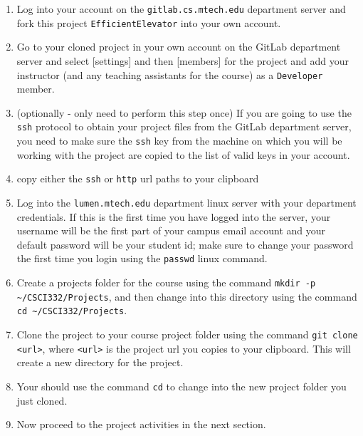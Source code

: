 \documentclass[10pt]{article}
\begin{document}
\begin{enumerate}
   \item Log into your account on the \verb|gitlab.cs.mtech.edu| department server and fork this project \verb|EfficientElevator| into your own account.
   
   \item Go to your cloned project in your own account on the GitLab department server and select [settings] and then [members] for the project and add your instructor (and any teaching assistants for the course) as a \verb|Developer| member. 
   
   \item (optionally - only need to perform this step once) If you are going to use the \verb|ssh| protocol to obtain your project files from the GitLab department server, you need to make sure the \verb|ssh| key from the machine on which you will be working with the project are copied to the list of valid keys in your account.
   
   \item copy either the \verb|ssh| or \verb|http| url paths to your clipboard
   
   \item Log into the \verb|lumen.mtech.edu| department linux server with your department credentials. If this is the first time you have logged into the server, your username will be the first part of your campus email account and your default password will be your student id; make sure to change your password the first time you login using the \verb|passwd| linux command.
   
   \item Create a projects folder for the course using the command \verb|mkdir -p ~/CSCI332/Projects|, and then change into this directory using the command \verb|cd ~/CSCI332/Projects|.
   
   \item Clone the project to your course project folder using the command \verb|git clone <url>|, where \verb|<url>| is the project url you copies to your clipboard. This will create a new directory for the project. 
   
   \item Your should use the command \verb|cd| to change into the new project folder you just cloned.
   
   \item Now proceed to the project activities in the next section.
\end{enumerate}
\end{document}
